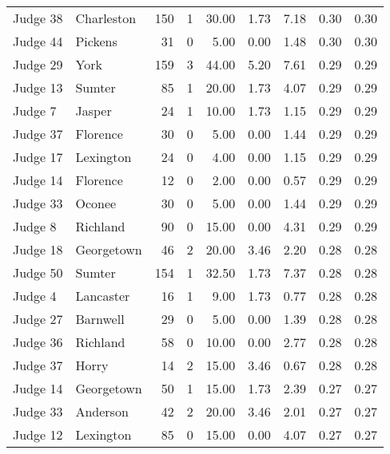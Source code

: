 \begin{tabular}{llrrrrrrr}
Judge 38 &   Charleston &   150 &      1 & 30.00 &       1.73 &      7.18 &         0.30 &      0.30 \\
Judge 44 &      Pickens &    31 &      0 &  5.00 &       0.00 &      1.48 &         0.30 &      0.30 \\
Judge 29 &         York &   159 &      3 & 44.00 &       5.20 &      7.61 &         0.29 &      0.29 \\
Judge 13 &       Sumter &    85 &      1 & 20.00 &       1.73 &      4.07 &         0.29 &      0.29 \\
 Judge 7 &       Jasper &    24 &      1 & 10.00 &       1.73 &      1.15 &         0.29 &      0.29 \\
Judge 37 &     Florence &    30 &      0 &  5.00 &       0.00 &      1.44 &         0.29 &      0.29 \\
Judge 17 &    Lexington &    24 &      0 &  4.00 &       0.00 &      1.15 &         0.29 &      0.29 \\
Judge 14 &     Florence &    12 &      0 &  2.00 &       0.00 &      0.57 &         0.29 &      0.29 \\
Judge 33 &       Oconee &    30 &      0 &  5.00 &       0.00 &      1.44 &         0.29 &      0.29 \\
 Judge 8 &     Richland &    90 &      0 & 15.00 &       0.00 &      4.31 &         0.29 &      0.29 \\
Judge 18 &   Georgetown &    46 &      2 & 20.00 &       3.46 &      2.20 &         0.28 &      0.28 \\
Judge 50 &       Sumter &   154 &      1 & 32.50 &       1.73 &      7.37 &         0.28 &      0.28 \\
 Judge 4 &    Lancaster &    16 &      1 &  9.00 &       1.73 &      0.77 &         0.28 &      0.28 \\
Judge 27 &     Barnwell &    29 &      0 &  5.00 &       0.00 &      1.39 &         0.28 &      0.28 \\
Judge 36 &     Richland &    58 &      0 & 10.00 &       0.00 &      2.77 &         0.28 &      0.28 \\
Judge 37 &        Horry &    14 &      2 & 15.00 &       3.46 &      0.67 &         0.28 &      0.28 \\
Judge 14 &   Georgetown &    50 &      1 & 15.00 &       1.73 &      2.39 &         0.27 &      0.27 \\
Judge 33 &     Anderson &    42 &      2 & 20.00 &       3.46 &      2.01 &         0.27 &      0.27 \\
Judge 12 &    Lexington &    85 &      0 & 15.00 &       0.00 &      4.07 &         0.27 &      0.27 \\

\end{tabular}

